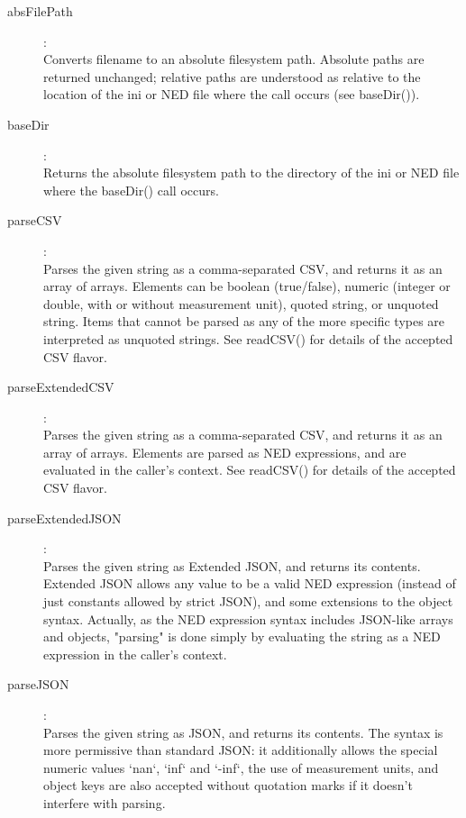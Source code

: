 \begin{description}
\item[absFilePath]:  \\
    Converts filename to an absolute filesystem path. Absolute paths are
    returned unchanged; relative paths are understood as relative to the
    location of the ini or NED file where the call occurs (see baseDir()).

\item[baseDir]:  \\
    Returns the absolute filesystem path to the directory of the ini or NED
    file where the baseDir() call occurs.

\item[parseCSV]:  \\
    Parses the given string as a comma-separated CSV, and returns it as an
    array of arrays. Elements can be boolean (true/false), numeric (integer or
    double, with or without measurement unit), quoted string, or unquoted
    string. Items that cannot be parsed as any of the more specific types are
    interpreted as unquoted strings. See readCSV() for details of the accepted
    CSV flavor.

\item[parseExtendedCSV]:  \\
    Parses the given string as a comma-separated CSV, and returns it as an
    array of arrays. Elements are parsed as NED expressions, and are evaluated
    in the caller's context. See readCSV() for details of the accepted CSV
    flavor.

\item[parseExtendedJSON]:  \\
    Parses the given string as Extended JSON, and returns its contents.
    Extended JSON allows any value to be a valid NED expression (instead of
    just constants allowed by strict JSON), and some extensions to the object
    syntax. Actually, as the NED expression syntax includes JSON-like arrays
    and objects, "parsing" is done simply by evaluating the string as a NED
    expression in the caller's context.

\item[parseJSON]:  \\
    Parses the given string as JSON, and returns its contents. The syntax is
    more permissive than standard JSON: it additionally allows the special
    numeric values `nan`, `inf` and `-inf`, the use of measurement units, and
    object keys are also accepted without quotation marks if it doesn't
    interfere with parsing.


\end{description}
